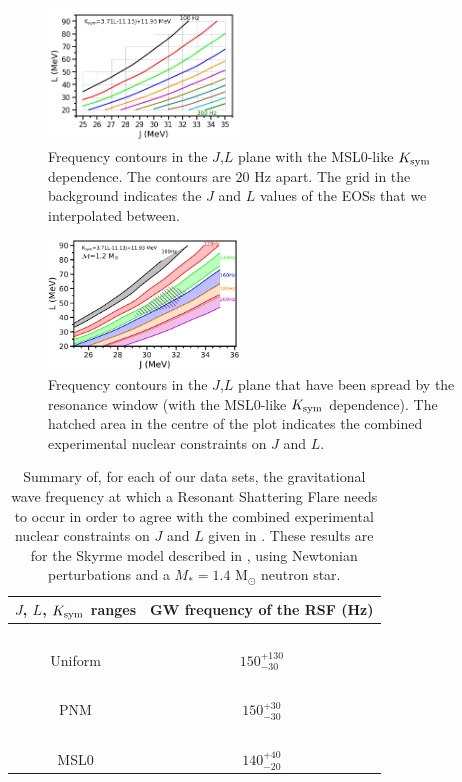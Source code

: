 \documentclass[fleqn,usenatbib]{mnras}
\begin{document}
\begin{figure}
\centering
\includegraphics[width=0.45\textwidth,angle=0]{MSL0_contours_20gap}
\caption{Frequency contours in the $J$,$L$ plane with the MSL0-like $K_{\rm sym}$ dependence. The contours are $20$ Hz apart. The grid in the background indicates the $J$ and $L$ values of the EOSs that we interpolated between.}
\label{fig:MSL0_contours_20gap}
\end{figure}

\begin{figure}
\centering
\includegraphics[width=0.45\textwidth,angle=0]{MSL0_JL_Kdfspread_2.png}
\caption{Frequency contours in the $J$,$L$ plane that have been spread by the resonance window (with the MSL0-like $K_{\rm sym}$ dependence). The hatched area in the centre of the plot indicates the combined experimental nuclear constraints on $J$ and $L$.}
\label{fig:MSL0_shaded_constraints}
\end{figure}









\begin{table}
\centering
\begin{tabular}{|c|c|}
\hline
$J$, $L$, $K_{\rm sym}$ ranges&GW frequency of the RSF (Hz)\\

\hline
$ $& $ $\\[-9pt]
Uniform&$150^{+130}_{-30}$\\
\hline
$ $& $ $\\[-9pt]
PNM&$150^{+30}_{-30}$\\
\hline
$ $& $ $\\[-9pt]
MSL0&$140^{+40}_{-20}$\\
\hline
\end{tabular}
\caption{Summary of, for each of our data sets, the gravitational wave frequency at which a Resonant Shattering Flare needs to occur in order to agree with the combined experimental nuclear constraints on $J$ and $L$ given in \citet{lattimer2013constraining}. These results are for the Skyrme model described in \citet{newton2020nuclear}, using Newtonian perturbations and a $M_*=1.4$ M${_\odot}$ neutron star.}
\label{tab:freq_to_match_nuclear}
\end{table}
\end{document}
